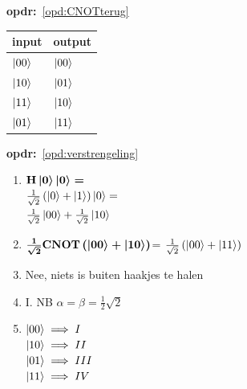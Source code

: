 \documentclass[../../main.tex]{subfiles}
\begin{document}
\textbf{opdr:}~\ref{opd:CNOTterug}%

\begin{tabular}{|l|l|}
\hline
input& output\\ \hline
$\ket{00}$&$\ket{00}$ \\ \hline %
$\ket{10}$&$\ket{01}$ \\ \hline %
$\ket{11}$&$\ket{10}$ \\ \hline %
$\ket{01}$&$\ket{11}$ \\ \hline %
\end{tabular}

\textbf{opdr:}~\ref{opd:verstrengeling}%

\begin{enumerate}[wide, labelwidth=!, labelindent=0pt]
\item
$\port{H}\ket{0}\ket{0}=$\\
$\tfrac{1}{\sqrt{2}}\left(\ket{0}+\ket{1}\right)\ket{0}=$\\
$\tfrac{1}{\sqrt{2}}\ket{00}+\tfrac{1}{\sqrt{2}}\ket{10}$
\item $\tfrac{1}{\sqrt{2}}\port{CNOT}\left(\ket{00}+\ket{10}\right)$=
$\tfrac{1}{\sqrt{2}}\left(\ket{00}+\ket{11}\right)$

\item Nee, niets is buiten haakjes te halen
\item I. NB $\alpha=\beta=\tfrac{1}{2}\sqrt{2}$
\item $\ket{00} \implies I$\\
$\ket{10}\implies II$\\
$\ket{01}\implies III$\\
$\ket{11}\implies IV$
\end{enumerate}
\end{document}
